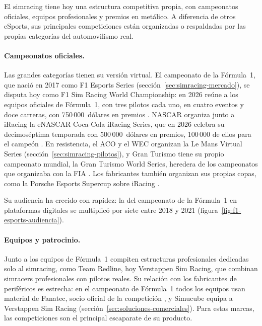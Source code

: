 El simracing tiene hoy una estructura competitiva propia, con campeonatos oficiales, equipos profesionales y premios en metálico. A diferencia de otros eSports, sus principales competiciones están organizadas o respaldadas por las propias categorías del automovilismo real.

\paragraph{Campeonatos oficiales.}
Las grandes categorías tienen su versión virtual. El campeonato de la Fórmula~1, que nació en 2017 como F1 Esports Series (sección~\ref{sec:simracing-mercado}), se disputa hoy como F1 Sim Racing World
Championship: en 2026 reúne a los equipos oficiales de Fórmula~1, con tres pilotos cada uno, en cuatro eventos y doce carreras, con 750\,000~dólares en premios \parencite{fanatec_web}. NASCAR organiza junto a iRacing la eNASCAR Coca-Cola iRacing Series, que en 2026 celebra su decimoséptima temporada con
500\,000~dólares en premios, 100\,000 de ellos para el campeón \parencite{iracing_news}. En resistencia, el ACO y el WEC organizan la Le Mans Virtual Series (sección~\ref{sec:simracing-pilotos}), y Gran Turismo
tiene su propio campeonato mundial, la Gran Turismo World Series, heredera de los campeonatos que organizaba con la FIA \parencite{granturismo_web}. Los fabricantes también organizan sus propias copas, como la Porsche Esports Supercup sobre iRacing \parencite{iracing_news}.

Su audiencia ha crecido con rapidez: la del campeonato de la Fórmula~1 en plataformas digitales se multiplicó por siete entre 2018 y 2021 (figura~\ref{fig:f1-esports-audiencia}).



\paragraph{Equipos y patrocinio.}
Junto a los equipos de Fórmula~1 compiten estructuras profesionales dedicadas solo al simracing, como Team Redline, hoy Verstappen Sim Racing, que combinan simracers profesionales con pilotos reales. Su relación con los fabricantes de periféricos es estrecha: en el campeonato de Fórmula~1 todos los equipos usan material de Fanatec, socio oficial de la competición \parencite{fanatec_web}, y Simucube equipa a Verstappen Sim Racing (sección~\ref{sec:soluciones-comerciales}). Para estas marcas, las competiciones son el principal escaparate de su producto.

